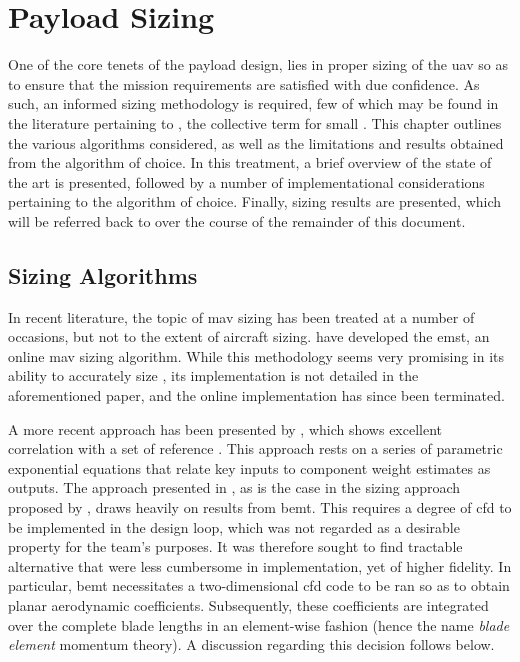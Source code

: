 \chapter{Payload Sizing}

One of the core tenets of the payload design, lies in proper sizing of the \gls{uav} so as to ensure that the mission requirements are satisfied with due confidence. As such, an informed sizing methodology is required, few of which may be found in the literature pertaining to , the collective term for small . This chapter outlines the various algorithms considered, as well as the limitations and results obtained from the algorithm of choice. In this treatment, a brief overview of the state of the art is presented, followed by a number of implementational considerations pertaining to the algorithm of choice. Finally, sizing results are presented, which will be referred back to over the course of the remainder of this document.

\section{Sizing Algorithms}

In recent literature, the topic of \gls{mav} sizing has been treated at a number of occasions, but not to the extent of aircraft sizing. \citet{Bershadsky2016} have developed the \gls{emst}, an online \gls{mav} sizing algorithm. While this methodology seems very promising in its ability to accurately size , its implementation is not detailed in the aforementioned paper, and the online implementation has since been terminated.

A more recent approach has been presented by \citet{Winslow2018}, which shows excellent correlation with a set of reference . This approach rests on a series of parametric exponential equations that relate key inputs to component weight estimates as outputs. The approach presented in \citep{Winslow2018}, as is the case in the sizing approach proposed by \citet{Shastry2018}, draws heavily on results from \gls{bemt}. This requires a degree of \gls{cfd} to be implemented in the design loop, which was not regarded as a desirable property for the team's purposes. It was therefore sought to find tractable alternative that were less cumbersome in implementation, yet of higher fidelity. In particular, \gls{bemt} necessitates a two-dimensional \gls{cfd} code to be ran so as to obtain planar aerodynamic coefficients. Subsequently, these coefficients are integrated over the complete blade lengths in an element-wise fashion (hence the name \textit{blade element} momentum theory). A discussion regarding this decision follows below.

